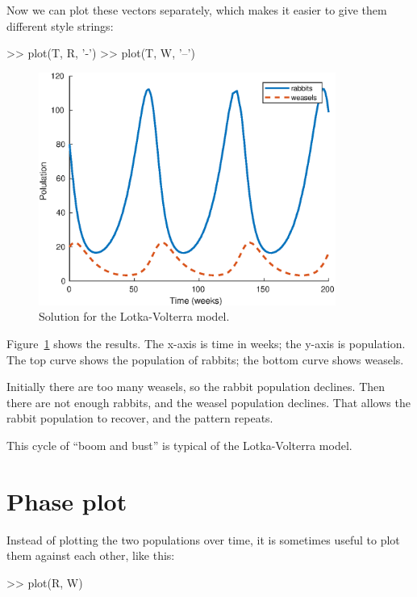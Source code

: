 \documentclass[
]{book}
\numberwithin{Answer}{chapter}
\numberwithin{Exercise}{chapter}
\begin{document}
Now we can plot these vectors separately, which makes it easier to give them different style strings:

\begin{code}
>> plot(T, R, '-')
>> plot(T, W, '--')
\end{code}

\begin{figure}
\centerline{\includegraphics[height=3in]{figs/lotka.eps}}
\caption{Solution for the Lotka-Volterra model.}
\label{fig:lotka}
\end{figure}

Figure~\ref{fig:lotka} shows the results. The x-axis is time in weeks; the y-axis is population.  The top curve shows the population of rabbits; the bottom curve shows weasels.

Initially there are too many weasels, so the rabbit population declines.  Then there are not enough rabbits, and the weasel population declines.  That allows the rabbit population to recover, and the pattern repeats.

This cycle of ``boom and bust'' is typical of the Lotka-Volterra model.

\section{Phase plot}

Instead of plotting the two populations over time, it is sometimes useful to plot them against each other, like this:

\begin{code}
>> plot(R, W)
\end{code}
\end{document}
